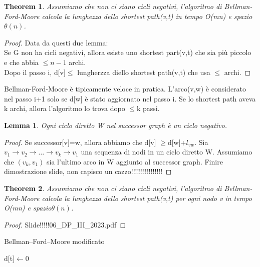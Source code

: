 \documentclass{article}
\newtheorem{theorem}{Theorem}[subsection]
\newtheorem{lemma}{Lemma}[subsection]
\begin{document}
\begin{theorem}
    Assumiamo che non ci siano cicli negativi, l'algoritmo di Bellman-Ford-Moore calcola la lunghezza dello shortest path(v,t) in tempo O(mn) e spazio$\theta(n)$.
\end{theorem}
\begin{proof}
    Data da questi due lemma:\\
     Se G non ha cicli negativi, allora esiste uno shortest part(v,t) che sia più piccolo e che abbia $\leq n-1$ archi.\\
     Dopo il passo i, d[v]$\leq$ lungherzza diello shortest path(v,t) che usa $\leq$ archi.
\end{proof}
Bellman-Ford-Moore è tipicamente veloce in pratica. L'arco(v,w) è considerato nel passo i+1 solo se d[w] è stato aggiornato nel passo i. Se lo shortest path aveva k archi, allora l'algoritmo lo trova dopo $\leq$k passi.
\begin{lemma}
    Ogni ciclo diretto W nel successor graph è un ciclo negativo.
\end{lemma}
\begin{proof}
    Se successor[v]=w, allora abbiamo che d[v] $\geq$d[w]+$l_{vw}$. Sia $v_1 \rightarrow v_2 \rightarrow \dots \rightarrow v_k \rightarrow v_1 $ una sequenza di nodi in un ciclo diretto W. Assumiamo che $(v_k,v_1)$ sia l'ultimo arco in W aggiunto al successor graph. 
    Finire dimostrazione slide, non capisco un cazzo!!!!!!!!!!!!!!!!
\end{proof}
\begin{theorem}
   Assumiamo che non ci siano cicli negativi, l'algoritmo di Bellman-Ford-Moore calcola la lunghezza dello shortest path(v,t) per ogni nodo v in tempo O(mn) e spazio$\theta(n)$.
\end{theorem}
\begin{proof}
    Slide!!!!!06\_DP\_III\_2023.pdf
\end{proof}
\begin{center}
\begin{algorithm}
\caption{Bellman–Ford–Moore modificato}
d[t]$\leftarrow0\;$
\end{algorithm}
\end{center}
\end{document}
